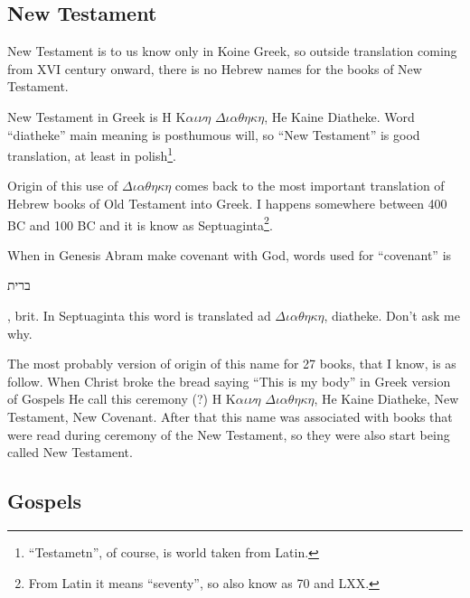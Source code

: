 \documentclass[a4paper,11pt]{article}
\begin{document}
\subsection{New Testament} %



New Testament is to us know only in Koine Greek, so outside translation
coming from XVI century onward, there is no Hebrew names for the books of
New Testament.

New Testament in Greek is H K$\alpha \iota \nu \eta$ $\Delta \iota \alpha \theta \eta \kappa \eta$, He Kaine Diatheke.
Word ``diatheke'' main meaning is posthumous will, so ``New Testament'' is
good translation, at least in polish\footnote{``Testametn'', of course, is
  world taken from Latin.}.

Origin of this use of $\Delta \iota \alpha \theta \eta \kappa \eta$ comes back to the most important
translation of Hebrew books of Old Testament into Greek. I happens somewhere
between 400 BC and 100 BC and it is know as Septuaginta\footnote{From Latin
  it means ``seventy'', so also know as 70 and LXX.}.

When in Genesis Abram make covenant with God, words used for ``covenant'' is
\begin{hebrew} ברית \end{hebrew}, brit. In Septuaginta this word is
translated ad $\Delta \iota \alpha \theta \eta \kappa \eta$, diatheke. Don't ask me why.

The most probably version of origin of this name for 27 books, that I know,
is as follow. When Christ broke the bread saying ``This is my body'' in
Greek version of Gospels He call this ceremony (?)
H K$\alpha \iota \nu \eta$ $\Delta \iota \alpha \theta \eta \kappa \eta$, He Kaine Diatheke, New Testament, New
Covenant. After that this name was associated with books that were read
during ceremony of the New Testament, so they were also start being called
New Testament.










\subsection{Gospels} %
\end{document}
